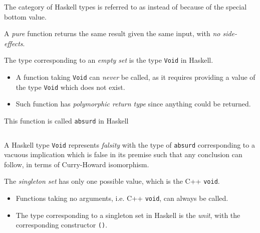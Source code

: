 \begin{remark}
    The category of Haskell types is referred to as  instead of  because of the special bottom value.
\end{remark}

\begin{definition}
    A \textit{pure} function returns the same result given the same input, with \textit{no side-effects}.
\end{definition}

\begin{definition}
    The type corresponding to an \textit{empty set} is the type \texttt{Void} in Haskell.
    \begin{itemize}
        \item A function taking \texttt{Void} can \textit{never} be called, as it requires providing a value of the type \texttt{Void} which does not exist.
        \item Such function has \textit{polymorphic return type} since anything could be returned.
    \end{itemize}
    
    This function is called \texttt{absurd} in Haskell
    \inputminted{hs}{content/code-listings/absurd.hs}
\end{definition}

\begin{remark}
    A Haskell type \texttt{Void} represents \textit{falsity} with the type of \texttt{absurd} corresponding to a vacuous implication which is false in its premise such that any conclusion can follow, in terms of Curry-Howard isomorphism.
\end{remark}

\begin{definition}
    The \textit{singleton set} has only one possible value, which is the C++ \texttt{void}.
    \begin{itemize}
        \item Functions taking no arguments, i.e. C++ \texttt{void}, can always be called.
        \item The type corresponding to a singleton set in Haskell is the \textit{unit}, with the corresponding constructor \texttt{()}.
    \end{itemize}
\end{definition}

